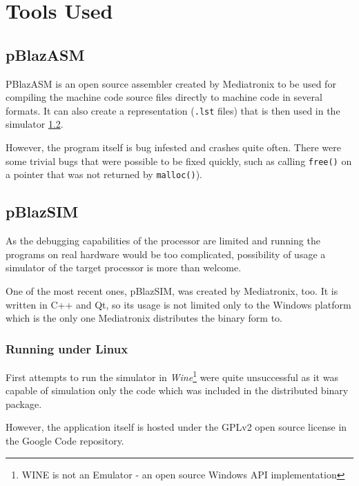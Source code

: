     \section{Tools Used}

        \subsection{pBlazASM}\label{pblazasm}

        PBlazASM is an open source assembler created by Mediatronix to be used for compiling the machine code source files directly to machine code in several formats. It can also create a representation (\texttt{.lst} files) that is then used in the simulator \ref{pblazsim}.

        However, the program itself is bug infested and crashes quite often. There were some trivial bugs that were possible to be fixed quickly, such as calling \texttt{free()} on a pointer that was not returned by \texttt{malloc()}).

        \subsection{pBlazSIM}\label{pblazsim}

        As the debugging capabilities of the processor are limited and running the programs on real hardware would be too complicated, possibility of usage a simulator of the target processor is more than welcome.

        One of the most recent ones, pBlazSIM, was created by Mediatronix, too. It is written in C++ and Qt, so its usage is not limited only to the Windows platform which is the only one Mediatronix distributes the binary form to.

            \subsubsection{Running under Linux}

            First attempts to run the simulator in \emph{Wine}\footnote{WINE is not an Emulator - an open source Windows API implementation} were quite unsuccessful as it was capable of simulation only the code which was included in the distributed binary package.

            However, the application itself is hosted under the GPLv2 open source license in the Google Code repository. 

